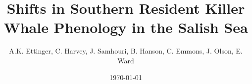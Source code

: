 \documentclass{article}
\begin{document}

\title{Shifts in Southern Resident Killer Whale Phenology in the Salish Sea}
\date{\today}
\maketitle
\author{A.K. Ettinger, C. Harvey, J. Samhouri, B. Hanson, C. Emmons, J. Olson, E. Ward}
\maketitle  %
\end{document}

